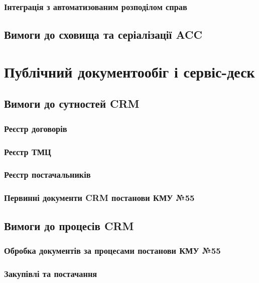 \subsubsection{Інтеграція з автоматизованим розподілом справ}

\subsection{Вимоги до сховища та серіалізації ACC}

\newpage
\section{Публічний документообіг і сервіс-деск}

\subsection{Вимоги до сутностей CRM}

\subsubsection{Реєстр договорів}

\subsubsection{Реєстр ТМЦ}

\subsubsection{Реєстр постачальників}

\subsubsection{Первинні документи CRM постанови КМУ №55}

\subsection{Вимоги до процесів CRM}

\subsubsection{Обробка документів за процесами постанови КМУ №55}

\subsubsection{Закупівлі та постачання}

